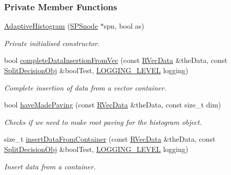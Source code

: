 \subsubsection*{\-Private \-Member \-Functions}
\begin{DoxyCompactItemize}
\item 
\hyperlink{classsubpavings_1_1AdaptiveHistogram_a40e81bf270e245055b487e3f9fa28a7f}{\-Adaptive\-Histogram} (\hyperlink{classsubpavings_1_1SPSnode}{\-S\-P\-Snode} $\ast$spn, bool as)
\begin{DoxyCompactList}\small\item\em \-Private initialised constructor. \end{DoxyCompactList}\item 
bool \hyperlink{classsubpavings_1_1AdaptiveHistogram_a929e006a5a2a0f40c68d77bc7dff70e7}{complete\-Data\-Insertion\-From\-Vec} (const \hyperlink{namespacesubpavings_a30e15e24c8d81a2160d7422ef3c39d68}{\-R\-Vec\-Data} \&the\-Data, const \hyperlink{classsubpavings_1_1SplitDecisionObj}{\-Split\-Decision\-Obj} \&bool\-Test, \hyperlink{namespacesubpavings_aef8e51096b59ecaf1a1e9b2ee24b6089}{\-L\-O\-G\-G\-I\-N\-G\-\_\-\-L\-E\-V\-E\-L} logging)
\begin{DoxyCompactList}\small\item\em \-Complete insertion of data from a vector container. \end{DoxyCompactList}\item 
bool \hyperlink{classsubpavings_1_1AdaptiveHistogram_ab5d45e2f1966bd43a7bb8bf041ea29db}{have\-Made\-Paving} (const \hyperlink{namespacesubpavings_a30e15e24c8d81a2160d7422ef3c39d68}{\-R\-Vec\-Data} \&the\-Data, const size\-\_\-t dim)
\begin{DoxyCompactList}\small\item\em \-Checks if we need to make root paving for the histogram object. \end{DoxyCompactList}\item 
size\-\_\-t \hyperlink{classsubpavings_1_1AdaptiveHistogram_a0eaca3eebf10b3d251ed284f0317c593}{insert\-Data\-From\-Container} (const \hyperlink{namespacesubpavings_a30e15e24c8d81a2160d7422ef3c39d68}{\-R\-Vec\-Data} \&the\-Data, const \hyperlink{classsubpavings_1_1SplitDecisionObj}{\-Split\-Decision\-Obj} \&bool\-Test, \hyperlink{namespacesubpavings_aef8e51096b59ecaf1a1e9b2ee24b6089}{\-L\-O\-G\-G\-I\-N\-G\-\_\-\-L\-E\-V\-E\-L} logging)
\begin{DoxyCompactList}\small\item\em \-Insert data from a container. \end{DoxyCompactList}\item 

\end{DoxyCompactItemize}
